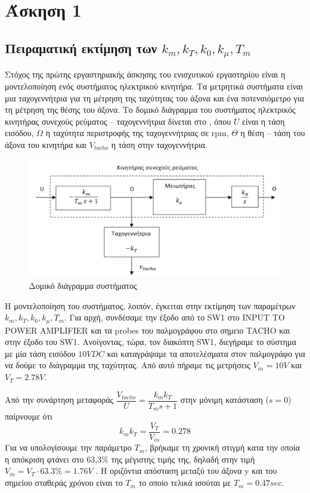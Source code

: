 \section{Άσκηση 1}
\subsection{Πειραματική εκτίμηση των $k_m, k_T, k_0, k_μ, T_m$}

Στόχος της πρώτης εργαστηριακής άσκησης του ενισχυτικού εργαστηρίου είναι η μοντελοποίηση ενός συστήματος ηλεκτρικού κινητήρα. Τα μετρητικά συστήματα είναι μια ταχογεννήτρια για τη μέτρηση της ταχύτητας του άξονα και ένα ποτενσιόμετρο για τη μέτρηση της θέσης του άξονα. Το δομικό διάγραμμα του συστήματος ηλεκτρικός κινητήρας συνεχούς ρεύματος – ταχογεννήτρια δίνεται στο , όπου $U$ είναι η τάση εισόδου, $Ω$ η ταχύτητα περιστροφής της ταχογεννήτριας σε rpm, $Θ$ η θέση – τάση του άξονα του κινητήρα και $V_{tacho}$ η τάση στην ταχογεννήτρια.

\begin{figure}[H]
  \begin{center}
    \includegraphics[width=\textwidth]{Images/blockdiagram.png}
  \end{center}
  \caption{Δομικό διάγραμμα συστήματος}
  \label{blockdiagram}
\end{figure}
Η μοντελοποίηση του συστήματος, λοιπόν, έγκειται στην εκτίμηση των παραμέτρων $k_m, k_T, k_0, k_μ, T_m$. Για αρχή, συνδέσαμε την έξοδο από το SW1 στο INPUT TO POWER AMPLIFIER και τα probes του παλμογράφου στο σημειο TACHO και στην έξοδο του SW1. Ανοίγοντας, τώρα, τον διακόπτη SW1, διεγήραμε το σύστημα με μία τάση εισόδου $10V DC$ και καταγράψαμε τα αποτελέσματα στον παλμογράφο για να δούμε το διάγραμμα της ταχύτητας. Από αυτό πήραμε τις μετρήσεις $V_{in} = 10V$ και $V_T = 2.78V$.

Από την συνάρτηση μεταφοράς $\dfrac{V_{tacho}}{U} = \dfrac{k_m k_T}{T_m s + 1}$ στην μόνιμη κατάσταση ($s=0$) παίρνουμε ότι 
\begin{equation}
	k_m k_T = \dfrac{V_T}{V_{in}} = 0.278
	\label{eq:kmkt}
\end{equation}
Για να υπολογίσουμε την παράμετρο $T_m$, βρήκαμε τη χρονική στιγμή κατα την οποία η απόκριση φτάνει στο 63,3\% της μέγιστης τιμής της, δηλαδή στην τιμή $V_m = V_T \cdot 63.3\% = 1.76V$ . Η οριζόντια απόσταση μεταξύ του άξονα y και του σημείου σταθεράς χρόνου είναι το $T_m$ το οποίο τελικά ισούται με $T_m = 0.47sec$.

